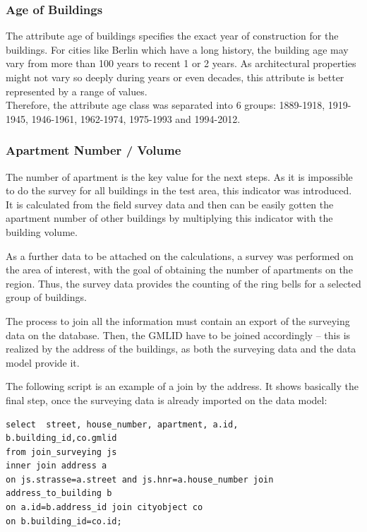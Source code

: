 \subsubsection{Age of Buildings}

The attribute age of buildings specifies the exact year of construction for the buildings. For cities like Berlin which have a long history, the building age may vary from more than 100 years to recent 1 or 2 years. As architectural properties might not vary so deeply during years or even decades, this attribute is better represented by a range of values. \\

Therefore, the attribute age class was separated into 6 groups: 1889-1918, 1919-1945, 1946-1961, 1962-1974, 1975-1993 and 1994-2012.\\
\subsubsection{Apartment Number / Volume}
The number of apartment is the key value for the next steps. As it is impossible to do the survey for all buildings in the test area, this indicator was introduced. It is calculated from the field survey data and then can be easily gotten the apartment number of other buildings by multiplying this indicator with the building volume.

As a further data to be attached on the calculations, a survey was performed on the area of interest, with the goal of obtaining the number of apartments on the region. Thus, the survey data provides the counting of the ring bells for a selected group of buildings.

The process to join all the information must contain an export of the surveying data on the database. Then, the GMLID have to be joined accordingly – this is realized by the address of the buildings, as both the surveying data and the data model provide it. 

The following script is an example of a join by the address. It shows basically the final step, once the surveying data is already imported on the data model:
\begin{lstlisting}
select  street, house_number, apartment, a.id,
b.building_id,co.gmlid
from join_surveying js
inner join address a
on js.strasse=a.street and js.hnr=a.house_number join
address_to_building b
on a.id=b.address_id join cityobject co
on b.building_id=co.id;
\end{lstlisting}

